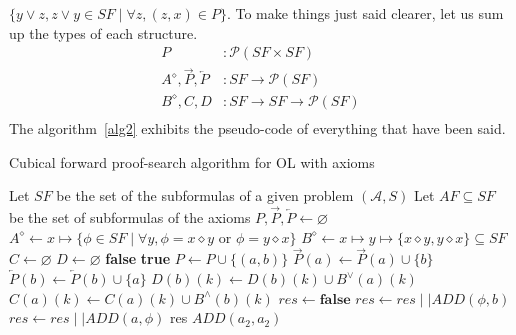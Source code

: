 \documentclass[a4paper, 11pt]{article}
\begin{document}
    $\{y\vee z,z\vee y\in SF\mid\forall z,(z,x)\in P\}$. To make things just said clearer, let us sum 
    up the types of each structure.
    \begin{align*}
	    P&:\mathcal{P}(SF\times SF)\\
	    A^\diamond,\overrightarrow{P},\overleftarrow{P}&:SF\rightarrow\mathcal{P}(SF)\\
	    B^\diamond,C,D&:SF\rightarrow SF\rightarrow\mathcal{P}(SF)\\
    \end{align*}
    The algorithm~\ref{alg2} exhibits the pseudo-code of everything that have been said.
    \begin{algorithm}
	    \caption{Cubical forward proof-search algorithm for OL with axioms}
	    \label{alg2}
	    \begin{algorithmic}
		\State Let $SF$ be the set of the subformulas of a given problem $(\mathcal{A},S)$
		\State Let $AF\subseteq SF$ be the set of subformulas of the axioms
		    \State $P,\overrightarrow{P},\overleftarrow{P}\gets\varnothing$
		    \State $A^\diamond\gets x\mapsto\{\phi\in SF\mid\forall y,\phi=x\diamond y\text{ or }
		    \phi=y\diamond x\}$
		\State $B^\diamond\gets x\mapsto y\mapsto \{x\diamond y,y\diamond x\}\subseteq SF$
		\State $C\gets\varnothing$
		\State $D\gets\varnothing$
			\State\Return\textbf{false}
			\EndIf
			\State \Return \textbf{true}
			\EndIf
			\State $P\gets P\cup\{(a,b)\}$
			\State $\overrightarrow{P}(a)\gets\overrightarrow{P}(a)\cup\{b\}$
			\State $\overleftarrow{P}(b)\gets\overleftarrow{P}(b)\cup\{a\}$
			\State $D(b)(k)\gets D(b)(k)\cup B^\vee(a)(k)$
			\EndFor
			\State $C(a)(k)\gets C(a)(k)\cup B^\wedge(b)(k)$
			\EndFor	
			\State $res\gets \textbf{false}$
			\State $res\gets res\mid\mid ADD(\phi,b)$
			\EndFor
			\State $res\gets res\mid\mid ADD(a,\phi)$
			\EndFor
			\State \Return res
		\EndProcedure
		    \State $ADD(a_2,a_2)$
		    \EndFor
	    \end{algorithmic}
    \end{algorithm}
\end{document}
